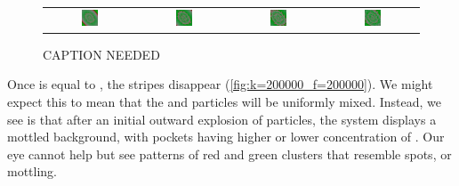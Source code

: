 \begin{figure}[h]
\begin{tabular}{c c c c}
\includegraphics[width = 0.2\textwidth]{../images/predator_prey_11_by_11_f_1.75_k_2_new_i4.png} & \includegraphics[width = 0.2\textwidth]{../images/../images/predator_prey_11_by_11_f_1.75_k_2_new_i5.png} & \includegraphics[width = 0.2\textwidth]{../images/../images/predator_prey_11_by_11_f_1.75_k_2_new_i6.png} & \includegraphics[width = 0.2\textwidth]{../images/../images/predator_prey_11_by_11_f_1.75_k_2_new_i7.png}
\end{tabular}
\caption{CAPTION NEEDED}
\label{fig:k=200000_f=175000}
\end{figure}

Once  is equal to , the stripes disappear (\autoref{fig:k=200000_f=200000}). We might expect this to mean that the  and  particles will be uniformly mixed. Instead, we see is that after an initial outward explosion of  particles, the system displays a mottled background, with pockets having higher or lower concentration of . Our eye cannot help but see patterns of red and green clusters that resemble spots, or mottling.\\

